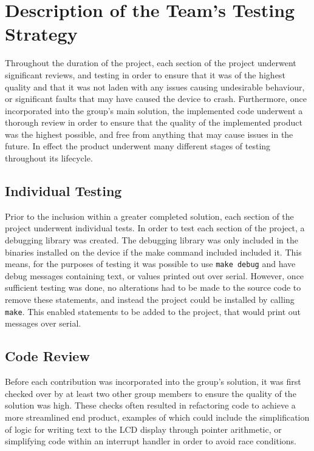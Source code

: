 \section{Description of the Team's Testing Strategy}

Throughout the duration of the project, each section of the project underwent 
significant reviews, and testing in order to ensure that it was of the highest 
quality and that it was not laden with any issues causing undesirable behaviour, 
or significant faults that may have caused the device to crash. Furthermore, once 
incorporated into the group's main solution, the implemented code underwent a 
thorough review in order to ensure that the quality of the implemented product 
was the highest possible, and free from anything that may cause issues in the 
future. In effect the product underwent many different stages of testing 
throughout its lifecycle. 

\subsection*{Individual Testing}

Prior to the inclusion within a greater completed solution, each section of the 
project underwent individual tests. In order to test each section of the project, 
a debugging library was created. The debugging library was only included in the 
binaries installed on the device if the make command included included it. This 
means, for the purposes of testing it was possible to use \texttt{make debug} 
and have debug messages containing text, or values printed out over serial. 
However, once sufficient testing was done, no 
alterations had to be made to the source code to remove these statements, and 
instead the project could be installed by calling \texttt{make}. 
This enabled statements to be added to the project, that would print out 
messages over serial.

\subsection*{Code Review}

Before each contribution was incorporated into the group's solution, it was 
first checked over by at least two other group members to ensure the quality of 
the solution was high. These checks often resulted in refactoring code to 
achieve a more streamlined end product, examples of which could include the 
simplification of logic for writing text to the LCD display through pointer 
arithmetic, or simplifying code within an interrupt handler in order to avoid 
race conditions. 

